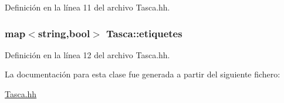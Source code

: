 Definición en la línea 11 del archivo Tasca.\-hh.

\hypertarget{class_tasca_a02e6c83bd74e95523e8ef9f47b18fa40}{
\subsubsection[{etiquetes}]{\setlength{\rightskip}{0pt plus 5cm}map$<$string,bool$>$ Tasca\-::etiquetes\hspace{0.3cm}{\ttfamily [private]}}}\label{class_tasca_a02e6c83bd74e95523e8ef9f47b18fa40}


Definición en la línea 12 del archivo Tasca.\-hh.



La documentación para esta clase fue generada a partir del siguiente fichero\-:\begin{DoxyCompactItemize}
\item 
\hyperlink{_tasca_8hh}{Tasca.\-hh}\end{DoxyCompactItemize}
